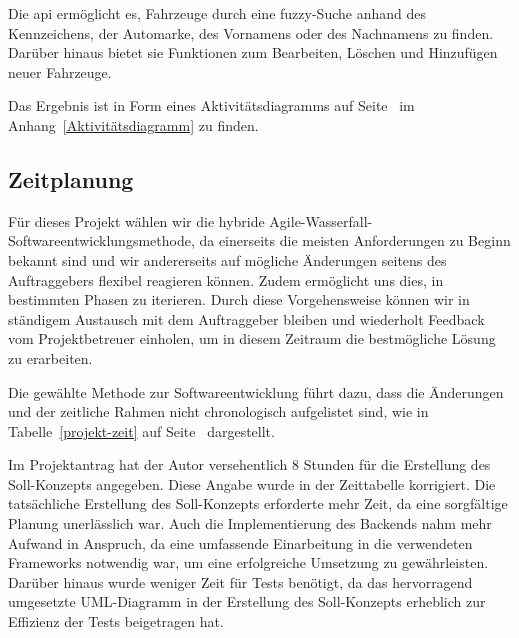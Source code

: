 Die \gls{api} ermöglicht es, Fahrzeuge durch eine \gls{fuzzy}-Suche anhand des Kennzeichens, der Automarke, des Vornamens oder des Nachnamens zu finden. Darüber hinaus bietet sie Funktionen zum Bearbeiten, Löschen und Hinzufügen neuer Fahrzeuge.

Das Ergebnis ist in Form eines Aktivitätsdiagramms auf Seite~\pageref{Aktivitätsdiagramm} im Anhang~\ref{Aktivitätsdiagramm} zu finden.

\subsection{Zeitplanung}

Für dieses Projekt wählen wir die hybride Agile-Wasserfall-Softwareentwicklungsmethode, da einerseits die meisten Anforderungen zu Beginn bekannt sind und wir andererseits auf mögliche Änderungen seitens des Auftraggebers flexibel reagieren können. Zudem ermöglicht uns dies, in bestimmten Phasen zu iterieren. Durch diese Vorgehensweise können wir in ständigem Austausch mit dem Auftraggeber bleiben und wiederholt Feedback vom Projektbetreuer einholen, um in diesem Zeitraum die bestmögliche Lösung zu erarbeiten.

Die gewählte Methode zur Softwareentwicklung führt dazu, dass die Änderungen und der zeitliche Rahmen nicht chronologisch aufgelistet sind, wie in Tabelle~\ref{projekt-zeit} auf Seite~\pageref{projekt-zeit} dargestellt.

Im Projektantrag hat der Autor versehentlich 8 Stunden für die Erstellung des Soll-Konzepts angegeben. Diese Angabe wurde in der Zeittabelle korrigiert. Die tatsächliche Erstellung des Soll-Konzepts erforderte mehr Zeit, da eine sorgfältige Planung unerlässlich war. Auch die Implementierung des Backends nahm mehr Aufwand in Anspruch, da eine umfassende Einarbeitung in die verwendeten Frameworks notwendig war, um eine erfolgreiche Umsetzung zu gewährleisten. Darüber hinaus wurde weniger Zeit für Tests benötigt, da das hervorragend umgesetzte UML-Diagramm in der Erstellung des Soll-Konzepts erheblich zur Effizienz der Tests beigetragen hat.

